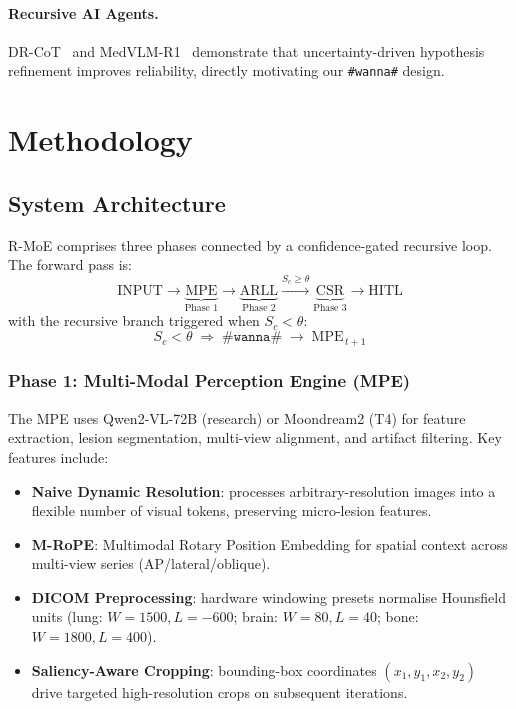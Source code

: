 \documentclass[10pt,twocolumn]{article}
\begin{document}
\paragraph{Recursive AI Agents.}
DR-CoT~\cite{pmc2025drcot} and MedVLM-R1~\cite{emergent2025medvlm} demonstrate
that uncertainty-driven hypothesis refinement improves reliability, directly
motivating our \texttt{\#wanna\#} design.

\section{Methodology}
\label{sec:method}

\subsection{System Architecture}
\label{ssec:arch}

R-MoE comprises three phases connected by a confidence-gated recursive loop.
The forward pass is:
\[
\text{INPUT} \to \underbrace{\text{MPE}}_{\text{Phase 1}}
             \to \underbrace{\text{ARLL}}_{\text{Phase 2}}
             \xrightarrow{S_c \ge \theta}
                \underbrace{\text{CSR}}_{\text{Phase 3}}
             \to \text{HITL}
\]
with the recursive branch triggered when $S_c < \theta$:
\[
S_c < \theta \;\Longrightarrow\; \texttt{\#wanna\#} \;\to\; \text{MPE}_{\,t+1}
\]

\subsubsection{Phase 1: Multi-Modal Perception Engine (MPE)}

The MPE uses Qwen2-VL-72B (research) or Moondream2 (T4) for feature extraction,
lesion segmentation, multi-view alignment, and artifact filtering.
Key features include:
\begin{itemize}[noitemsep]
  \item \textbf{Naive Dynamic Resolution}: processes arbitrary-resolution images
    into a flexible number of visual tokens, preserving micro-lesion features.
  \item \textbf{M-RoPE}: Multimodal Rotary Position Embedding for spatial context
    across multi-view series (AP/lateral/oblique).
  \item \textbf{DICOM Preprocessing}: hardware windowing presets normalise Hounsfield
    units (lung: $W{=}1500, L{=}{-}600$; brain: $W{=}80, L{=}40$; bone: $W{=}1800, L{=}400$).
  \item \textbf{Saliency-Aware Cropping}: bounding-box coordinates $(x_1,y_1,x_2,y_2)$
    drive targeted high-resolution crops on subsequent iterations.
\end{itemize}
\end{document}
